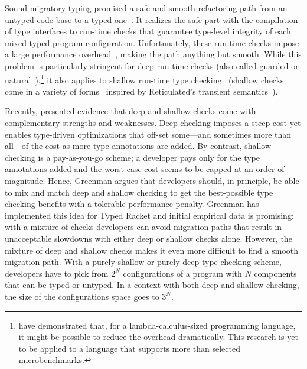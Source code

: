 
Sound migratory typing promised a safe and smooth refactoring path from an
untyped code base to a typed one~\cite{tf-dls-2006, tfffgksst-snapl-2017}. It
realizes the safe part with the compilation of type interfaces to run-time
checks that guarantee type-level integrity of each mixed-typed program configuration.
Unfortunately, these run-time checks impose a large performance
overhead~\cite{gtnffvf-jfp-2019}, making the path anything but smooth. While
this problem is particularly stringent for deep run-time checks (also called
guarded or natural~\cite{tf-dls-2006,st-sfp-2006}),\footnote{\citet{kas-pldi-2019}
have demonstrated that, for a lambda-calculus-sized programming language, it
might be possible to reduce the overhead dramatically. This research is yet to
be applied to a language that supports more than selected microbenchmarks.}
it also applies to shallow run-time type checking~\cite{gm-pepm-2018} (shallow
checks come in a variety of
forms~\cite{grmhn-vmil-2019,rmhn-ecoop-2019,glfd-pj-2022,lgmvpk-pj-2023}
inspired by Reticulated's transient
semantics~\cite{vksb-dls-2014,vss-popl-2017,v-thesis-2019}).

Recently, \citet{g-thesis-2020,g-deep-shallow} presented evidence that deep and
shallow checks come with complementary strengths and weaknesses. Deep checking
imposes a steep cost yet enables type-driven optimizations that off-set
some---and sometimes more than all---of the cost as more type annotations are
added. By contrast, shallow checking is a pay-as-you-go scheme; a developer pays
only for the type annotations added and the worst-case cost seems to be capped
at an order-of-magnitude. Hence, Greenman argues that developers should, in
principle, be able to mix and match deep and shallow checking to get the
best-possible type checking benefits with a tolerable performance penalty.
Greenman has implemented this idea for Typed Racket and initial empirical data
is promising: with a mixture of checks developers can avoid migration paths that
result in unacceptable slowdowns with either deep or shallow checks alone.
However, the mixture of deep and shallow checks makes it even more difficult to
find a smooth migration path. With a purely shallow or purely deep type checking
scheme, developers have to pick from $2^N$ configurations of a program with $N$
components that can be typed or untyped. In a context with both deep and shallow
checking, the size of the configurations space goes to $3^N$.

